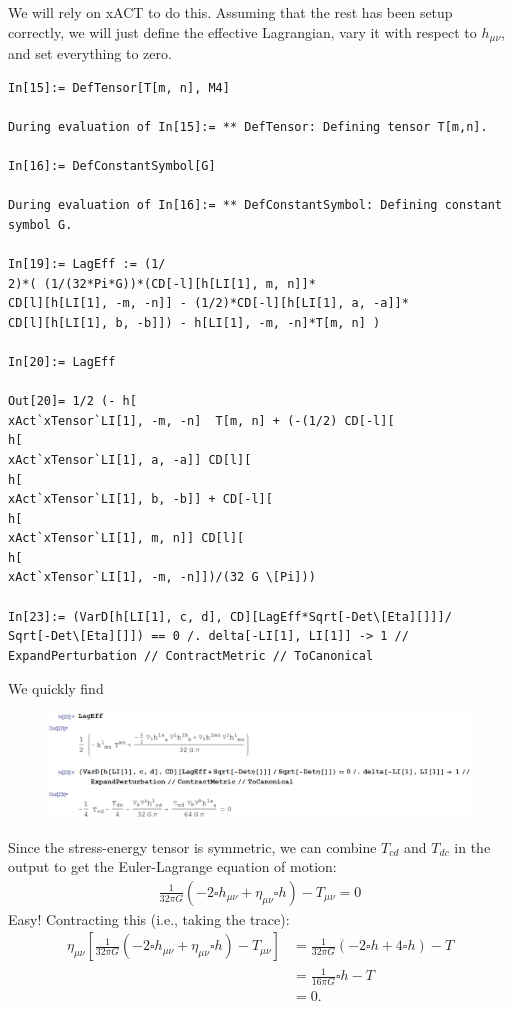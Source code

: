 \documentclass{book}
\theoremstyle{definition}
\newcommand{\nn}{\nonumber}
\newcommand{\f}[2]{\frac{#1}{#2}}
\newcommand{\lp}{\left(}
\newcommand{\rp}{\right)}
\newcommand{\lb}{\left[}
\newcommand{\rb}{\right]}
\begin{document}
We will rely on xACT to do this. Assuming that the rest has been setup correctly, we will just define the effective Lagrangian, vary it with respect to $h_{\mu\nu}$, and set everything to zero.
\begin{lstlisting}
In[15]:= DefTensor[T[m, n], M4]

During evaluation of In[15]:= ** DefTensor: Defining tensor T[m,n]. 

In[16]:= DefConstantSymbol[G]

During evaluation of In[16]:= ** DefConstantSymbol: Defining constant symbol G. 

In[19]:= LagEff := (1/
2)*( (1/(32*Pi*G))*(CD[-l][h[LI[1], m, n]]*
CD[l][h[LI[1], -m, -n]] - (1/2)*CD[-l][h[LI[1], a, -a]]*
CD[l][h[LI[1], b, -b]]) - h[LI[1], -m, -n]*T[m, n] )

In[20]:= LagEff

Out[20]= 1/2 (- h[
xAct`xTensor`LI[1], -m, -n]  T[m, n] + (-(1/2) CD[-l][
h[
xAct`xTensor`LI[1], a, -a]] CD[l][
h[
xAct`xTensor`LI[1], b, -b]] + CD[-l][
h[
xAct`xTensor`LI[1], m, n]] CD[l][
h[
xAct`xTensor`LI[1], -m, -n]])/(32 G \[Pi]))

In[23]:= (VarD[h[LI[1], c, d], CD][LagEff*Sqrt[-Det\[Eta][]]]/
Sqrt[-Det\[Eta][]]) == 0 /. delta[-LI[1], LI[1]] -> 1 // 
ExpandPerturbation // ContractMetric // ToCanonical
\end{lstlisting}
We quickly find
\begin{figure}[!htb]
	\includegraphics[scale=0.3]{newton-einstein}
\end{figure}
Since the stress-energy tensor is symmetric, we can combine $T_{cd}$ and $T_{dc}$ in the output to get the Euler-Lagrange equation of motion:
\begin{align}
\boxed{\f{1}{32\pi G}(- 2 \square h_{\mu\nu} + \eta_{\mu\nu} \square h) - T_{\mu\nu} = 0}
\end{align}
Easy! Contracting this (i.e., taking the trace):
\begin{align}
\eta_{\mu\nu}\lb\f{1}{32\pi G}(- 2 \square h_{\mu\nu} + \eta_{\mu\nu} \square h) - T_{\mu\nu}\rb &= \f{1}{32\pi G}\lp -2\square h + 4 \square h \rp - T \nn\\
&= \f{1}{16\pi G} \square h - T \nn\\
&= 0.
\end{align}
\end{document}
